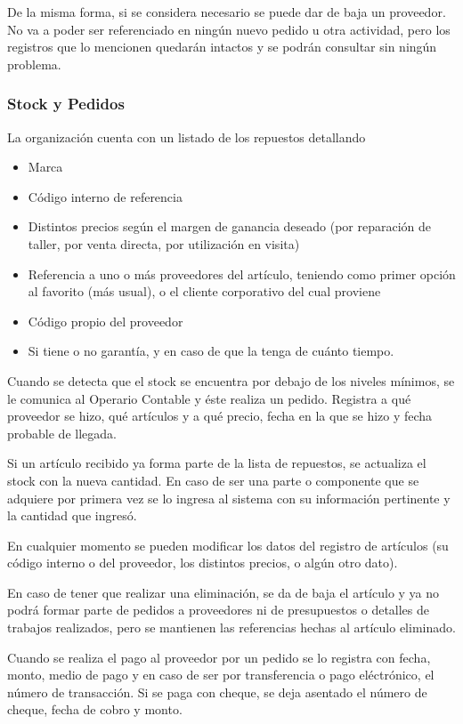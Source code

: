 \documentclass[12pt]{extarticle}
\begin{document}
\begin{spacing}{1.2}
    De la misma forma, si se considera necesario se puede dar de baja un proveedor. No va a poder ser referenciado en ningún nuevo pedido u otra actividad, pero los registros que lo mencionen quedarán intactos y se podrán consultar sin ningún problema.

    \subsubsection{Stock y Pedidos}

    La organización cuenta con un listado de los repuestos detallando 
    \begin{itemize}
        \item Marca
        \item Código interno de referencia
        \item Distintos precios según el margen de ganancia deseado (por reparación de taller, por venta directa, por utilización en visita)
        \item Referencia a uno o más proveedores del artículo, teniendo como primer opción al favorito (más usual), o el cliente corporativo del cual proviene
        \item Código propio del proveedor
        \item Si tiene o no garantía, y en caso de que la tenga de cuánto tiempo.
    \end{itemize}

    Cuando se detecta que el stock se encuentra por debajo de los niveles mínimos, se le comunica al Operario Contable y éste realiza un pedido. Registra a qué proveedor se hizo, qué artículos y a qué precio, fecha en la que se hizo y fecha probable de llegada. 

    Si un artículo recibido ya forma parte de la lista de repuestos, se actualiza el stock con la nueva cantidad. En caso de ser una parte o componente que se adquiere por primera vez se lo ingresa al sistema con su información pertinente y la cantidad que ingresó. 
        
    En cualquier momento se pueden modificar los datos del registro de artículos (su código interno o del proveedor, los distintos precios, o algún otro dato).

    En caso de tener que realizar una eliminación, se da de baja el artículo y ya no podrá formar parte de pedidos a proveedores ni de presupuestos o detalles de trabajos realizados, pero se mantienen las referencias hechas al artículo eliminado.

    Cuando se realiza el pago al proveedor por un pedido se lo registra con fecha, monto, medio de pago y en caso de ser por transferencia o pago eléctrónico, el número de transacción. Si se paga con cheque, se deja asentado el número de cheque, fecha de cobro y monto.


\end{spacing}
\end{document}
